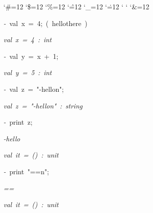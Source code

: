 \begin{list}{}
{\setlength{\leftmargin}{\leftmargini}
\setlength{\rightmargin}{0cm}
\setlength{\itemindent}{0cm}
\setlength{\listparindent}{0cm}
\setlength{\itemsep}{0cm}
\setlength{\parsep}{0cm}
\setlength{\labelsep}{0cm}
\setlength{\labelwidth}{0cm}
\catcode`\#=12
\catcode`\$=12
\catcode`\%=12
\catcode`\^=12
\catcode`\_=12
\catcode`\.=12
\catcode`
\catcode`
\catcode`\&=12
\ttfamily}
\small
\item[]\textsl{-\ }val\ x\ =\ 4;\ (\ hellothere\ )
\item[]\textsl{val\ x\ =\ 4\ :\ int}
\item[]\textsl{-\ }val\ y\ =\ x\ +\ 1;
\item[]\textsl{val\ y\ =\ 5\ :\ int}
\item[]\textsl{-\ }val\ z\ =\ "-hellon";
\item[]\textsl{val\ z\ =\ "-hellon"\ :\ string}
\item[]\textsl{-\ }print\ z;
\item[]\textsl{-hello}
\item[]\textsl{val\ it\ =\ ()\ :\ unit}
\item[]\textsl{-\ }print\ "==n";
\item[]\textsl{==}
\item[]\textsl{val\ it\ =\ ()\ :\ unit}
\end{list}
